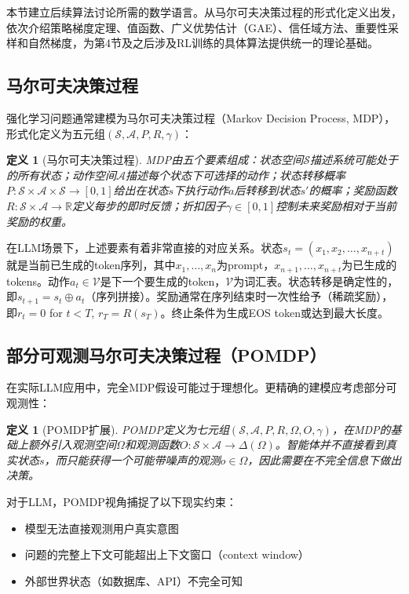 \documentclass[12pt,a4paper]{article}
\newtheorem{definition}[theorem]{定义}
\begin{document}
本节建立后续算法讨论所需的数学语言。从马尔可夫决策过程的形式化定义出发，依次介绍策略梯度定理、值函数、广义优势估计（GAE）、信任域方法、重要性采样和自然梯度，为第4节及之后涉及RL训练的具体算法提供统一的理论基础。

\subsection{马尔可夫决策过程}

强化学习问题通常建模为马尔可夫决策过程（Markov Decision Process, MDP），形式化定义为五元组$(\mathcal{S}, \mathcal{A}, P, R, \gamma)$：

\begin{definition}[马尔可夫决策过程]
MDP由五个要素组成：状态空间$\mathcal{S}$描述系统可能处于的所有状态；动作空间$\mathcal{A}$描述每个状态下可选择的动作；状态转移概率$P: \mathcal{S} \times \mathcal{A} \times \mathcal{S} \rightarrow [0,1]$给出在状态$s$下执行动作$a$后转移到状态$s'$的概率；奖励函数$R: \mathcal{S} \times \mathcal{A} \rightarrow \mathbb{R}$定义每步的即时反馈；折扣因子$\gamma \in [0,1]$控制未来奖励相对于当前奖励的权重。
\end{definition}

在LLM场景下，上述要素有着非常直接的对应关系。状态$s_t = (x_1, x_2, \ldots, x_{n+t})$就是当前已生成的token序列，其中$x_1, \ldots, x_n$为prompt，$x_{n+1}, \ldots, x_{n+t}$为已生成的tokens。动作$a_t \in \mathcal{V}$是下一个要生成的token，$\mathcal{V}$为词汇表。状态转移是确定性的，即$s_{t+1} = s_t \oplus a_t$（序列拼接）。奖励通常在序列结束时一次性给予（稀疏奖励），即$r_t = 0$ for $t < T$, $r_T = R(s_T)$。终止条件为生成EOS token或达到最大长度。

\subsection{部分可观测马尔可夫决策过程（POMDP）}

在实际LLM应用中，完全MDP假设可能过于理想化。更精确的建模应考虑部分可观测性：

\begin{definition}[POMDP扩展]
POMDP定义为七元组$(\mathcal{S}, \mathcal{A}, P, R, \Omega, O, \gamma)$，在MDP的基础上额外引入观测空间$\Omega$和观测函数$O: \mathcal{S} \times \mathcal{A} \rightarrow \Delta(\Omega)$。智能体并不直接看到真实状态$s$，而只能获得一个可能带噪声的观测$o \in \Omega$，因此需要在不完全信息下做出决策。
\end{definition}

对于LLM，POMDP视角捕捉了以下现实约束：
\begin{itemize}
    \item 模型无法直接观测用户真实意图
    \item 问题的完整上下文可能超出上下文窗口（context window）
    \item 外部世界状态（如数据库、API）不完全可知
\end{itemize}
\end{document}
